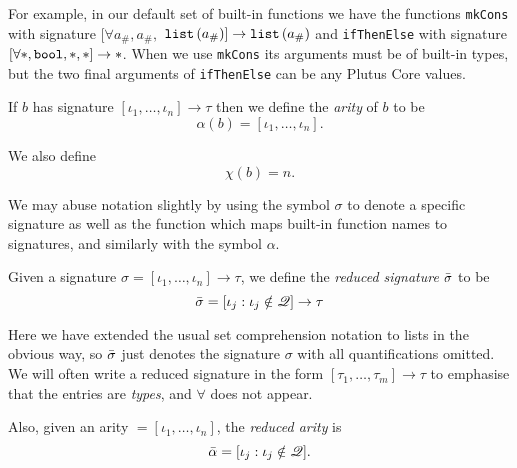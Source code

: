 
\noindent For example, in our default set of built-in functions we have the
functions \texttt{mkCons} with signature $[\forall a_\#, a_\#,$  %
  $\mathtt{list}\,\mathtt{(}a_\#\mathtt{)}] \rightarrow \mathtt{list}\,\mathtt{(}a_\#\mathtt{)}$ and \texttt{ifThenElse} with signature
$[\forallStar, \mathtt{bool}, \star, \star] \rightarrow \star$.  When we use
\texttt{mkCons} its arguments must be of built-in types, but the two final
arguments of \texttt{ifThenElse} can be any Plutus Core values.

\smallskip
\noindent If $b$ has signature $[\iota_1, \ldots, \iota_n] \rightarrow \tau$ then we define
the \textit{arity}  of $b$ to be
$$
\alpha(b) = [\iota_1, \ldots, \iota_n].
$$%

\noindent We also define
$$
  \chi(b) = n.
$$%

\noindent We may abuse notation slightly by using the symbol $\sigma$ to denote
a specific signature as well as the function which maps built-in function names
to signatures, and similarly with the symbol $\alpha$.

\medskip
\noindent Given a signature
$\sigma = [\iota_1, \ldots, \iota_n] \rightarrow \tau$,
we define the \textit{reduced signature} $\bar{\sigma}$ to be
$$
\bar{\sigma} = [\iota_j : \iota_j \notin \mathscr{Q}] \rightarrow \tau
$$%

\noindent Here we have extended the usual set comprehension notation to lists in the
obvious way, so $\bar{\sigma}$ just denotes the signature $\sigma$ with all
quantifications omitted. We will often write a reduced signature in the form
$[\tau_1, \ldots, \tau_m] \rightarrow \tau$ to emphasise that the entries are
\textit{types}, and $\mathbf{\forall}$ does not appear.

\medskip
\noindent Also, given an arity $= [\iota_1, \ldots, \iota_n]$, the \textit{reduced
  arity} is
$$
\bar{\alpha} = [\iota_j : \iota_j \notin \mathscr{Q}].
$$%

